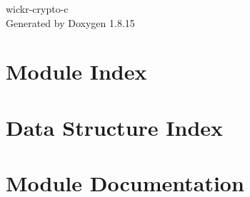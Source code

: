 \let\mypdfximage\pdfximage\def\pdfximage{\immediate\mypdfximage}\documentclass[twoside]{book}
\newcommand{\+}{\discretionary{\mbox{\scriptsize$\hookleftarrow$}}{}{}}
\newcommand{\clearemptydoublepage}{%
  \newpage{\pagestyle{empty}\cleardoublepage}%
}
\begin{document}
\hypersetup{pageanchor=false,
             bookmarksnumbered=true,
             pdfencoding=unicode
            }
\begin{titlepage}
\vspace*{7cm}
\begin{center}%
{\Large wickr-\/crypto-\/c }\\
\vspace*{1cm}
{\large Generated by Doxygen 1.8.15}\\
\end{center}
\end{titlepage}
\clearemptydoublepage
{}
\tableofcontents
\clearemptydoublepage
{}
\hypersetup{pageanchor=true}

\chapter{Module Index}

\chapter{Data Structure Index}

\chapter{Module Documentation}































\end{document}
